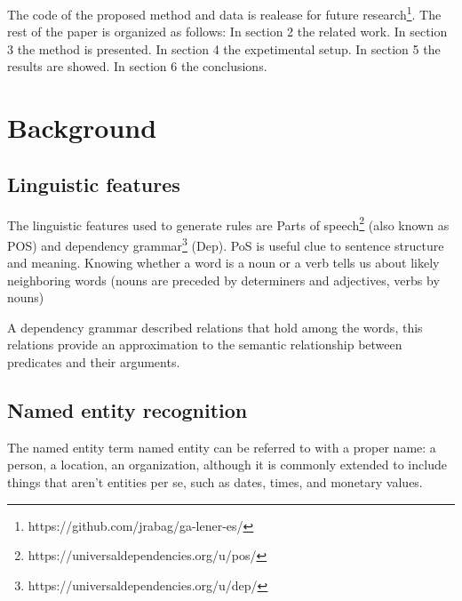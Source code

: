 \documentclass{IEEEtran}
\begin{document}
The code of the proposed method and data is realease for future research\footnote{https://github.com/jrabag/ga\--lener\--es/}. The rest of the paper is organized as follows:
In section 2 the related work. In section 3 the method is presented.
In section 4 the expetimental setup. In section 5 the results are showed. In section 6 the conclusions.



%
\IEEEpeerreviewmaketitle


\section{Background}

\subsection{Linguistic features}

The linguistic features used to generate rules are Parts of speech\footnote{https://universaldependencies.org/u/pos/} (also known as POS) and dependency grammar\footnote{https://universaldependencies.org/u/dep/} (Dep). PoS is useful clue to sentence structure and meaning. Knowing whether a word is a noun or a verb tells us about likely neighboring words (nouns are preceded by determiners and adjectives, verbs by nouns)\cite{martin-2020-speech}

A dependency grammar described relations that hold among the words, this relations provide an approximation to the semantic relationship between predicates and their arguments\cite{martin-2020-speech}.



\subsection{Named entity recognition}

The named entity term named entity can be referred to with a
proper name: a person, a location, an organization, although it is commonly extended to include things that aren't entities per se\cite{martin-2020-speech}, such as dates, times, and monetary values.
\end{document}
